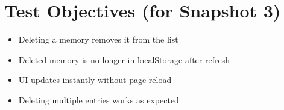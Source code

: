 \documentclass[12pt]{article}
\begin{document}
\section*{Test Objectives (for Snapshot 3)}
\begin{itemize}
  \item Deleting a memory removes it from the list
  \item Deleted memory is no longer in localStorage after refresh
  \item UI updates instantly without page reload
  \item Deleting multiple entries works as expected
\end{itemize}
\end{document}

